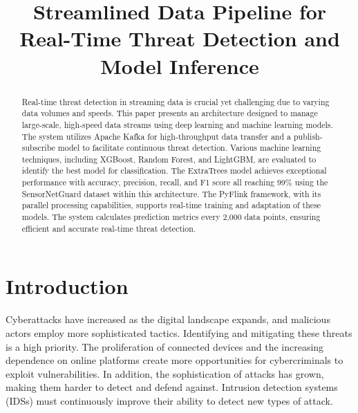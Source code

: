 \documentclass[runningheads]{llncs}
\begin{document}
%
\title{Streamlined Data Pipeline for Real-Time Threat Detection and Model Inference}
%
%
%
%
%
\maketitle              %
%
\begin{abstract}
Real-time threat detection in streaming data is crucial yet challenging due to varying data volumes and speeds. This paper presents an architecture designed to manage large-scale, high-speed data streams using deep learning and machine learning models. The system utilizes Apache Kafka for high-throughput data transfer and a publish-subscribe model to facilitate continuous threat detection. Various machine learning techniques, including XGBoost, Random Forest, and LightGBM, are evaluated to identify the best model for classification. The ExtraTrees model achieves exceptional performance with accuracy, precision, recall, and F1 score all reaching 99\% using the SensorNetGuard dataset within this architecture. The PyFlink framework, with its parallel processing capabilities, supports real-time training and adaptation of these models. The system calculates prediction metrics every 2,000 data points, ensuring efficient and accurate real-time threat detection. 

\end{abstract}
%
%
%

\section{Introduction}
\label{sec:Intro}

Cyberattacks have increased as the digital landscape expands, and malicious actors employ more sophisticated tactics. Identifying and mitigating these threats is a high priority. The proliferation of connected devices and the increasing dependence on online platforms create more opportunities for cybercriminals to exploit vulnerabilities. In addition, the sophistication of attacks has grown, making them harder to detect and defend against. Intrusion detection systems (IDSs) must continuously improve their ability to detect new types of attack.
\end{document}
